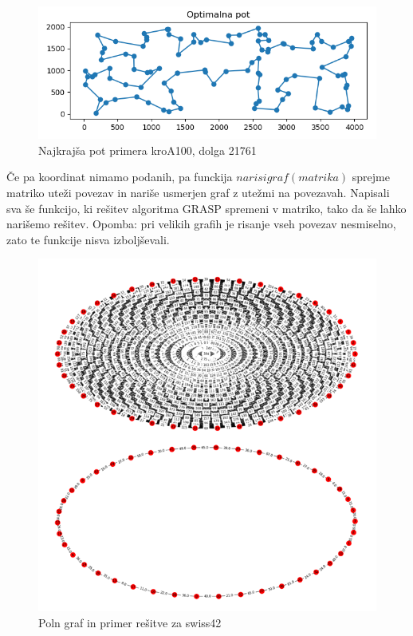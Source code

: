 \documentclass[12pt,a4paper]{amsart}
\theoremstyle{definition} %
\theoremstyle{plain} %
\begin{document}
\begin{figure}[H]
\caption{Najkrajša pot primera kroA100, dolga 21761}
\centering
\includegraphics[scale =0.5]{kroA100_21761}
\end{figure}

Če pa koordinat nimamo podanih, pa funckija $narisigraf(matrika)$ sprejme matriko uteži povezav in nariše usmerjen graf z utežmi na povezavah. Napisali sva še funkcijo, ki rešitev algoritma GRASP spremeni v matriko, tako da še lahko narišemo rešitev. 
Opomba: pri velikih grafih je risanje vseh povezav nesmiselno, zato te funkcije nisva izboljševali.
\begin{figure}[H]
\caption{Poln graf in primer rešitve za swiss42}
\centering
\includegraphics[scale =0.5]{swiss_primerjava}
\end{figure}
\end{document}
